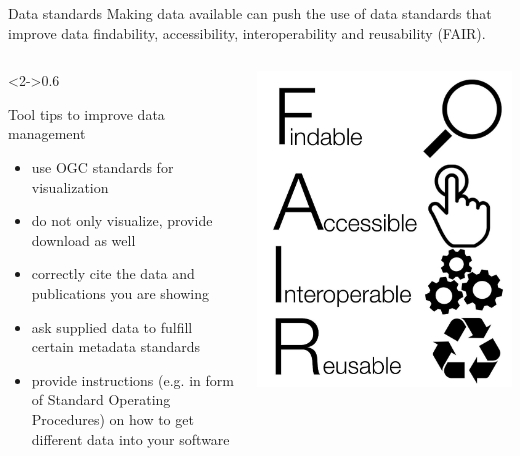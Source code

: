 \begin{frame}{Data standards}
    Making data available can push the use of data standards that improve data
    findability, accessibility, interoperability and reusability (FAIR).

    \vspace{1em}

    \begin{columns}[T]
        \begin{column}<2->{0.6\textwidth}
            \begin{block}{Tool tips to improve data management}
                \begin{itemize}
                    \item use OGC standards for visualization
                    \item do not only visualize, provide download as well
                    \item correctly cite the data and publications you are showing
                    \item ask supplied data to fulfill certain metadata standards
                    \item provide instructions (e.g. in form of Standard Operating Procedures) on how to get different data into your software
                \end{itemize}
            \end{block}
        \end{column}
        \begin{column}{0.3\textwidth}
            \includegraphics[width=\textwidth]{figures/FAIR_data_principles.jpg}
        \end{column}
    \end{columns}


\end{frame}
